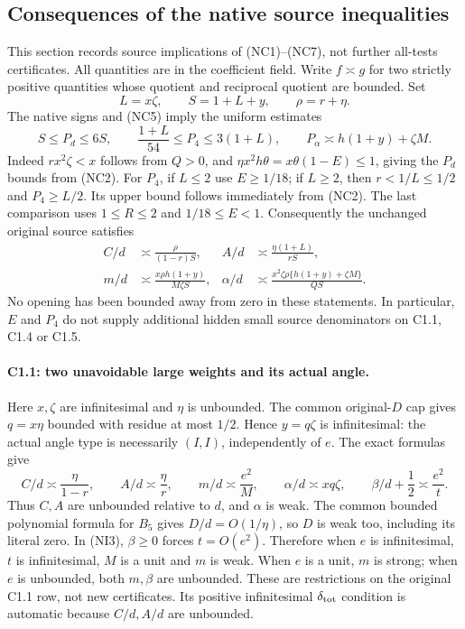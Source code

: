 \subsection{Consequences of the native source inequalities}

\label{component:p51451360ff4a}

\label{p51451360ff4a:sec:c1-residual-source-implications}

This section records source implications of (NC1)--(NC7), not further
all-tests certificates. All quantities are in the coefficient field.
Write $f\asymp g$ for two strictly positive quantities whose quotient
and reciprocal quotient are bounded. Set
\[
             L=x\zeta,\qquad S=1+L+y,\qquad \rho=r+\eta.
\]
The native signs and (NC5) imply the uniform estimates
\[
 S\le P_d\le6S,\qquad
 \frac{1+L}{54}\le P_4\le3(1+L),\qquad
 P_\alpha\asymp h(1+y)+\zeta M.                 \tag{NI1}
\]
Indeed $rx^2\zeta<x$ follows from $Q>0$, and
$\eta x^2h\theta=x\theta(1-E)\le1$, giving the $P_d$ bounds
from (NC2). For $P_4$, if $L\le2$ use $E\ge1/18$; if $L\ge2$,
then $r<1/L\le1/2$ and $P_4\ge L/2$. Its upper bound follows
immediately from (NC2). The last comparison uses $1\le R\le2$
and $1/18\le E<1$.
Consequently the unchanged original source satisfies
\begin{align*}
 C/d&\asymp\frac{\rho}{(1-r)S},&
 A/d&\asymp\frac{\eta(1+L)}{rS},\\
 m/d&\asymp\frac{x\rho h(1+y)}{M\zeta S},&
 \alpha/d&\asymp
 \frac{x^2\zeta\rho\{h(1+y)+\zeta M\}}{QS}.
 \tag{NI2}
\end{align*}
No opening has been bounded away from zero in these statements.
In particular, $E$ and $P_4$ do not supply additional hidden small
source denominators on C1.1, C1.4 or C1.5.

\paragraph{C1.1: two unavoidable large weights and its actual angle.}
Here $x,\zeta$ are infinitesimal and $\eta$ is unbounded.
The common original-$D$ cap gives $q=x\eta$ bounded with
residue at most $1/2$. Hence $y=q\zeta$ is infinitesimal:
the actual angle type is necessarily $(I,I)$, independently of $e$.
The exact formulas give
\[
 C/d\asymp\frac{\eta}{1-r},\qquad
 A/d\asymp\frac{\eta}{r},\qquad
 m/d\asymp\frac{e^2}{M},\qquad
 \alpha/d\asymp xq\zeta,\qquad
 \beta/d+\frac12\asymp\frac{e^2}{t}.             \tag{NI3}
\]
Thus $C,A$ are unbounded relative to $d$, and $\alpha$ is weak.
The common bounded polynomial formula for $B_5$ gives $D/d=O(1/\eta)$,
so $D$ is weak too, including its literal zero. In (NI3), $\beta\ge0$
forces $t=O(e^2)$. Therefore when $e$ is infinitesimal, $t$ is
infinitesimal, $M$ is a unit and $m$ is weak. When $e$ is a unit,
$m$ is strong; when $e$ is unbounded, both $m,\beta$ are unbounded.
These are restrictions on the original C1.1 row, not new certificates.
Its positive infinitesimal $\delta_{\rm tot}$ condition is automatic
because $C/d,A/d$ are unbounded.

